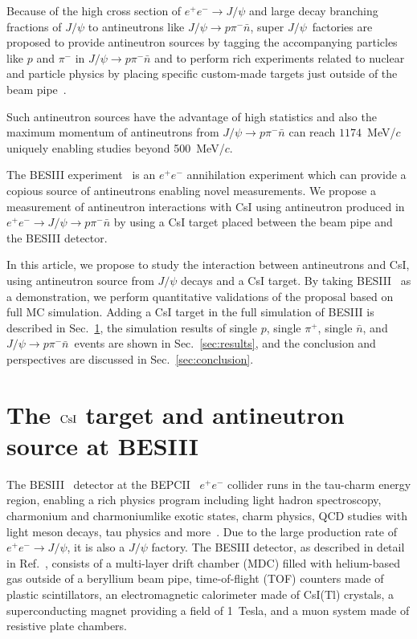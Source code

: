 \documentclass[aps,preprint,showkeys,superscriptaddress]{revtex4}
\newcommand{\nbar}{$\bar{n}$}
\newcommand{\jpsi}{$J/\psi$}
\begin{document}
Because of the high cross section of $e^+e^-\to J/\psi$ and large decay
branching fractions of $J/\psi$ to antineutrons like $J/\psi\to p\pi^-\bar{n}$,
super \jpsi~factories are proposed to provide antineutron sources by tagging
the accompanying particles like $p$ and $\pi^-$ in $J/\psi\to p\pi^-\bar{n}$
and to perform rich experiments related to nuclear and particle physics by
placing specific custom-made targets just outside of the beam
pipe~\cite{hypronProjectileFromJpsi}. 

Such antineutron sources have the advantage of high statistics 
and also the maximum momentum of antineutrons from $J/\psi\to p\pi^-\bar{n}$ 
can reach $1174$~MeV/$c$ uniquely enabling studies beyond 500~MeV/$c$.

The BESIII experiment~\cite{bes3} is an $e^+e^-$ annihilation experiment which
can provide a copious source of antineutrons enabling novel measurements.
We propose a measurement of antineutron interactions with CsI 
using antineutron produced in $e^+e^-\to J/\psi\to p\pi^-\bar{n}$ by 
using a CsI target placed between the beam pipe and the BESIII detector. 

In this article, we propose to study the interaction between
antineutrons and CsI, using antineutron source from $J/\psi$ decays and a CsI
target. By taking BESIII~\cite{bes3} as a demonstration, we perform
quantitative validations of the proposal based on full MC simulation. Adding a
CsI target in the full simulation of BESIII is described in
Sec.~\ref{sec:target}, the simulation results of single $p$, single $\pi^+$,
single $\bar{n}$, and $J/\psi\to p\pi^-$\nbar\ events are shown in
Sec.~\ref{sec:results}, and the conclusion and perspectives are discussed in
Sec.~\ref{sec:conclusion}. 

\section{\boldmath The ${\rm CsI}$ target and antineutron source at BESIII}
\label{sec:target}
%    
The BESIII~\cite{bes3} detector at the BEPCII~\cite{bepc2} $e^+e^-$ collider
runs in the tau-charm energy region, enabling a rich physics program 
including light hadron spectroscopy, charmonium and charmoniumlike exotic states, 
charm physics, QCD studies with light meson decays, tau physics 
and more~\cite{bes3physics,bes3physicsFuture}.
Due to the large production rate of $e^+e^-\to J/\psi$, it is also a $J/\psi$
factory. The BESIII detector, as described in detail in Ref.~\cite{bes3},
consists of a multi-layer drift chamber (MDC) filled with helium-based gas
outside of a beryllium beam pipe, time-of-flight (TOF) counters made of plastic
scintillators, an electromagnetic calorimeter made of CsI(Tl) crystals, a
superconducting magnet providing a field of 1~Tesla, and a muon system made of
resistive plate chambers.
    
\end{document}
